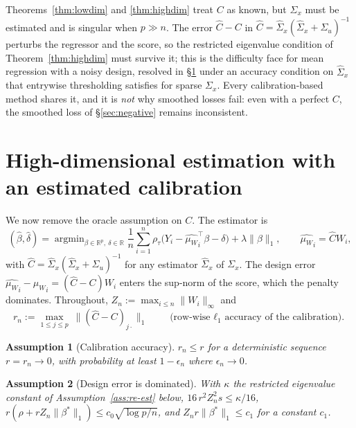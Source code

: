 \documentclass[12pt,a4paper]{article}
\newtheorem{assumption}{Assumption}[section]
\theoremstyle{definition}
\theoremstyle{remark}
\newcommand{\R}{\mathbb{R}}
\newcommand{\argmin}{\mathop{\mathrm{argmin}}}
\newcommand{\betas}{\beta^*}
\newcommand{\muv}{\mu_W}
\newcommand{\Ccal}{C}
\begin{document}
Theorems~\ref{thm:lowdim} and \ref{thm:highdim} treat $\Ccal$ as known, but $\Sigma_x$ must
be estimated and is singular when $p\gg n$. The error $\hat\Ccal-\Ccal$ in
$\hat\Ccal = \hat\Sigma_x(\hat\Sigma_x+\Sigma_u)^{-1}$ perturbs the regressor and the score,
so the restricted eigenvalue condition of Theorem~\ref{thm:highdim} must survive it; this is
the difficulty \citet{loh2012highdim} face for mean regression with a noisy design, resolved
in \S\ref{sec:estimated} under an accuracy condition on $\hat\Sigma_x$ that entrywise
thresholding satisfies for sparse $\Sigma_x$. Every calibration-based method shares it, and
it is \emph{not} why smoothed losses fail: even with a perfect $\Ccal$, the smoothed loss of
\S\ref{sec:negative} remains inconsistent.

\section{High-dimensional estimation with an estimated calibration}
\label{sec:estimated}

We now remove the oracle assumption on $\Ccal$. The estimator is
\begin{equation}
(\hat\beta,\hat\delta) = \argmin_{\beta\in\R^p,\ \delta\in\R}
\frac1n\sum_{i=1}^n \rho_\tau\big(Y_i - {\hat{\muv}}_i^\top\beta - \delta\big)
+ \lambda\|\beta\|_1 ,
\qquad {\hat{\muv}}_i = \hat\Ccal W_i ,
\label{eq:estimated}
\end{equation}
with $\hat\Ccal = \hat\Sigma_x(\hat\Sigma_x+\Sigma_u)^{-1}$ for any estimator $\hat\Sigma_x$
of $\Sigma_x$. The design error ${\hat{\muv}}_i - {\muv}_i = (\hat\Ccal-\Ccal)W_i$ enters the
sup-norm of the score, which the penalty dominates. Throughout,
$Z_n := \max_{i\le n}\|W_i\|_\infty$ and
\begin{equation}
r_n := \max_{1\le j\le p}\ \big\|(\hat\Ccal-\Ccal)_{j\cdot}\big\|_1
\qquad\text{(row-wise $\ell_1$ accuracy of the calibration).}
\end{equation}

\begin{assumption}[Calibration accuracy]
\label{ass:calib-acc}
$r_n \le r$ for a deterministic sequence $r = r_n \to 0$, with probability at least
$1-\epsilon_n$ where $\epsilon_n\to0$.
\end{assumption}

\begin{assumption}[Design error is dominated]
\label{ass:small-design}
With $\kappa$ the restricted eigenvalue constant of Assumption~\ref{ass:re-est} below,
$16\,r^2Z_n^2s \le \kappa/16$, $r(\rho + rZ_n\|\betas\|_1) \le c_0\sqrt{\log p/n}$, and
$Z_nr\|\betas\|_1\le c_1$ for a constant $c_1$.
\end{assumption}
\end{document}

